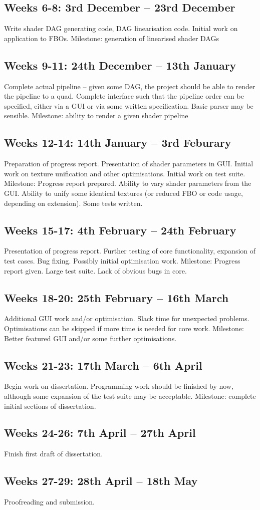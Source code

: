 \subsection{Weeks 6-8: 3rd December – 23rd December}
Write shader DAG generating code, DAG linearisation code. Initial work on application to FBOs.
Milestone: generation of linearised shader DAGs
\subsection{Weeks 9-11: 24th December – 13th January}
Complete actual pipeline – given some DAG, the project should be able to render the pipeline to a
quad. Complete interface such that the pipeline order can be specified, either via a GUI or via some
written specification. Basic parser may be sensible.
Milestone: ability to render a given shader pipeline
\subsection{Weeks 12-14: 14th January – 3rd Feburary}
Preparation of progress report. Presentation of shader parameters in GUI. Initial
work on texture unification and other optimisations. Initial work on test suite.
Milestone: Progress report prepared. Ability to vary shader parameters from the GUI. Ability to
unify some identical textures (or reduced FBO or code usage, depending on extension). Some tests
written.
\subsection{Weeks 15-17: 4th February – 24th February}
Presentation of progress report. Further testing of core functionality, expansion of test cases. Bug
fixing. Possibly initial
optimisation work.
Milestone: Progress report given. Large test suite. Lack of obvious bugs in core.
\subsection{Weeks 18-20: 25th February – 16th March}
Additional GUI work and/or optimisation. Slack time for unexpected problems. Optimisations can
be skipped if more time is needed for core work.
Milestone: Better featured GUI and/or some further optimisations.
\subsection{Weeks 21-23: 17th March – 6th April}
Begin work on dissertation. Programming work should be finished by now, although some
expansion of the test suite may be acceptable.
Milestone: complete initial sections of dissertation.
\subsection{Weeks 24-26: 7th April – 27th April}
Finish first draft of dissertation.
\subsection{Weeks 27-29: 28th April – 18th May}
Proofreading and submission.

